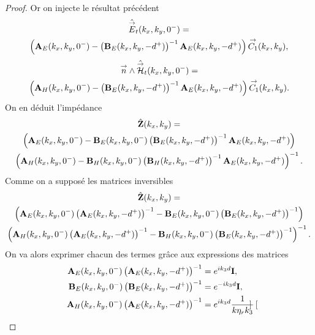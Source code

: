 \begin{proof}
            Or on injecte le résultat précédent
            \begin{multline*}
                \hat {{\overset{\rightarrow}{E}}}_t(k_x,k_y,0^-) =
                \\
                \left(\mathbf{A}_E(k_x,k_y,0^-)-\left(\mathbf{B}_E(k_x,k_y,-d^+)\right)^{-1}\mathbf{A}_E(k_x,k_y,-d^+)\right){\overset{\rightarrow}{C_1}}(k_x,k_y),
            \end{multline*}
            \begin{multline*}
                {\overset{\rightarrow}{n}} \wedge \hat {{\overset{\rightarrow}{\mathcal{H}}}}_t(k_x,k_y,0^-) =
                \\
                \left(\mathbf{A}_H(k_x,k_y,0^-)-\left(\mathbf{B}_E(k_x,k_y,-d^+)\right)^{-1}\mathbf{A}_E(k_x,k_y,-d^+)\right){\overset{\rightarrow}{C_1}}(k_x,k_y).
            \end{multline*}
            On en déduit l'impédance
            \begin{multline*}
                \hat {\mathbf{Z}}(k_x,k_y) =
                \\
                \left(\mathbf{A}_E(k_x,k_y,0^-)-\mathbf{B}_E(k_x,k_y,0^-)\left(\mathbf{B}_E(k_x,k_y,-d^+)\right)^{-1}\mathbf{A}_E(k_x,k_y,-d^+)\right)
                \\
                \left(\mathbf{A}_H(k_x,k_y,0^-)-\mathbf{B}_H(k_x,k_y,0^-)\left(\mathbf{B}_H(k_x,k_y,-d^+)\right)^{-1}\mathbf{A}_E(k_x,k_y,-d^+)\right)^{-1}.
            \end{multline*}
            Comme on a supposé les matrices inversibles
            \begin{multline*}
                \hat {\mathbf{Z}}(k_x,k_y) =
                \\ \left(\mathbf{A}_E(k_x,k_y,0^-)\left(\mathbf{A}_E(k_x,k_y,-d^+)\right)^{-1}-\mathbf{B}_E(k_x,k_y,0^-)\left(\mathbf{B}_E(k_x,k_y,-d^+)\right)^{-1}\right) 
                \\
                \left(\mathbf{A}_H(k_x,k_y,0^-)\left(\mathbf{A}_E(k_x,k_y,-d^+)\right)^{-1}-\mathbf{B}_H(k_x,k_y,0^-)\left(\mathbf{B}_E(k_x,k_y,-d^+)\right)^{-1}\right)^{-1}.
            \end{multline*}
            On va alors exprimer chacun des termes grâce aux expressions des matrices
            \begin{align*}
                \mathbf{A}_E(k_x,k_y,0^-)\left(\mathbf{A}_E(k_x,k_y,-d^+)\right)^{-1} &= e^{ik_3d}\mathbf{I},
                \\
                \mathbf{B}_E(k_x,k_y,0^-)\left(\mathbf{B}_E(k_x,k_y,-d^+)\right)^{-1} &= e^{-ik_3d}\mathbf{I},
                \\
                \mathbf{A}_H(k_x,k_y,0^-)\left(\mathbf{A}_E(k_x,k_y,-d^+)\right)^{-1} &= e^{ik_3d}\dfrac{1}{k\eta_r k_3}
                \begin{bmatrix}

\end{bmatrix}
\end{align*}
\end{proof}

